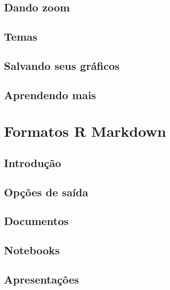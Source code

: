 \documentclass[
]{latex/krantz}
\theoremstyle{definition}
\theoremstyle{definition}
\theoremstyle{definition}
\theoremstyle{definition}
\theoremstyle{remark}
\begin{document}
\hypertarget{dando-zoom}{%
\section{Dando zoom}\label{dando-zoom}}

\hypertarget{temas}{%
\section{Temas}\label{temas}}

\hypertarget{salvando-seus-gruxe1ficos}{%
\section{Salvando seus gráficos}\label{salvando-seus-gruxe1ficos}}

\hypertarget{aprendendo-mais-2}{%
\section{Aprendendo mais}\label{aprendendo-mais-2}}

\hypertarget{formatos-r-markdown}{%
\chapter{Formatos R Markdown}\label{formatos-r-markdown}}

\hypertarget{introduuxe7uxe3o-19}{%
\section{Introdução}\label{introduuxe7uxe3o-19}}

\hypertarget{opuxe7uxf5es-de-sauxedda}{%
\section{Opções de saída}\label{opuxe7uxf5es-de-sauxedda}}

\hypertarget{documentos}{%
\section{Documentos}\label{documentos}}

\hypertarget{notebooks}{%
\section{Notebooks}\label{notebooks}}

\hypertarget{apresentauxe7uxf5es}{%
\section{Apresentações}\label{apresentauxe7uxf5es}}
\end{document}
